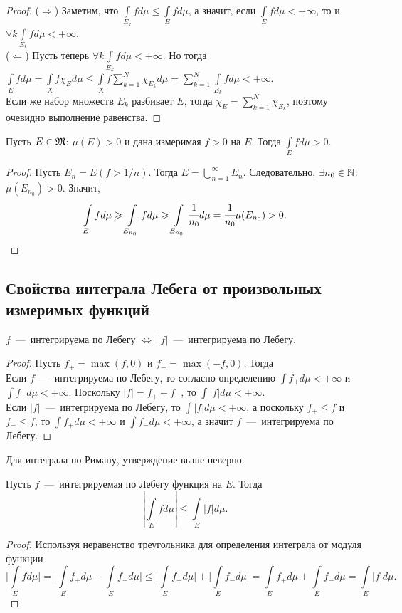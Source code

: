 \begin{proof}
    ($\Longrightarrow$) Заметим, что $\int\limits_{E_k} fd\mu \leq \int\limits_{E}fd\mu$, а значит, если $\int\limits_E fd\mu < +\infty$, то и $\forall k \int\limits_{E_k} fd\mu < +\infty$. \\
    ($\Longleftarrow$) Пусть теперь $\forall k \int\limits_{E_k} fd\mu < +\infty$. Но тогда $\int\limits_{E} fd\mu = \int\limits_X f\chi_{E}d\mu \leq \int\limits_X f\sum\limits_{k = 1}^N \chi_{E_k}d\mu = \sum\limits_{k = 1}^N \int\limits_{E_k} fd\mu < +\infty$. \\
    Если же набор множеств $E_k$ разбивает $E$, тогда $\chi_E = \sum\limits_{k = 1}^N \chi_{E_k}$, поэтому очевидно выполнение равенства.
\end{proof}
\begin{proposition}
    Пусть $E \in \MM$: $\mu(E) > 0$ и дана измеримая $f > 0$ на $E$. Тогда $\int\limits_{E} fd\mu > 0$.
\end{proposition}
\begin{proof}
    Пусть $E_n = E(f > 1/n)$. Тогда $E = \bigcup\limits_{n = 1}^\infty E_n$. Следовательно, $\exists n_0 \in \N$: $\mu(E_{n_0}) > 0$. Значит, \[\int\limits_{E} fd\mu \geq \int\limits_{E_{n_0}} fd\mu \geq \int\limits_{E_{n_0}} \cfrac{1}{n_0}d\mu = \cfrac{1}{n_0} \mu(E_{n_0}) > 0.\]
\end{proof}

\subsection{Свойства интеграла Лебега от произвольных измеримых функций}
\begin{proposition}
    $f$~---~интегрируема по Лебегу $\Longleftrightarrow$ $|f|$~---~интегрируема по Лебегу.
\end{proposition}
\begin{proof}
    Пусть $f_+ = \max(f, 0)$ и $f_- = \max(-f, 0)$. Тогда \\
    Если $f$~---~интегрируема по Лебегу, то согласно определению $\int f_+ d\mu < +\infty$ и $\int f_-d\mu < +\infty$. Поскольку $|f| = f_+ + f_-$, то $\int |f|d\mu < +\infty$. \\
    Если $|f|$~---~интегрируема по Лебегу, то $\int |f|d\mu < +\infty$, а поскольку $f_+ \leq f$ и $f_- \leq f$, то $\int f_+ d\mu < +\infty$ и $\int f_- d\mu < +\infty$, а значит $f$~---~интегрируема по Лебегу.
\end{proof}
\begin{note}
    Для интеграла по Риману, утверждение выше неверно.
\end{note}
\begin{proposition}
    Пусть $f$~---~интегрируемая по Лебегу функция на $E$. Тогда $$|\int\limits_E fd\mu| \leq \int\limits_E |f|d\mu.$$
\end{proposition}
\begin{proof} Используя неравенство треугольника для определения интеграла от модуля функции
    \[\Bigg|\int\limits_E fd\mu\Bigg| = \Bigg|\int\limits_{E} f_+d\mu - \int\limits_E f_-d\mu\Bigg| \leq \Bigg|\int\limits_E f_+d\mu\Bigg| + \Bigg|\int\limits_E f_-d\mu\Bigg| = \int\limits_E f_+d\mu + \int\limits_E f_-d\mu = \int\limits_E |f|d\mu.\]
\end{proof}

